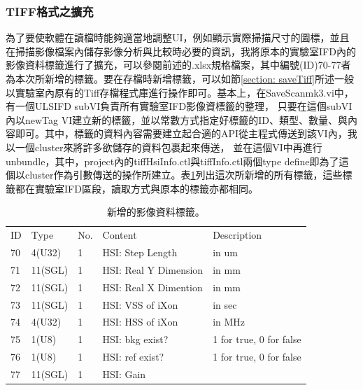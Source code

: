 \documentclass[12pt]{article}
\begin{document}
    \subsubsection{TIFF格式之擴充}
    為了要使軟體在讀檔時能夠適當地調整UI，例如顯示實際掃描尺寸的圖標，並且在掃描影像檔案內儲存影像分析與比較時必要的資訊，我將原本的實驗室IFD內的影像資料標籤進行了擴充，可以參閱前述的.xlsx規格檔案，其中編號(ID)70-77者
    為本次所新增的標籤。要在存檔時新增標籤，可以如節\ref{section: saveTiff}所述一般以實驗室內原有的Tiff存檔程式庫進行操作即可。基本上，在SaveScan\textunderscore mk3.vi中，有一個ULSIFD subVI負責所有實驗室IFD影像資標籤的整理，
    只要在這個subVI內以newTag VI建立新的標籤，並以常數方式指定好標籤的ID、類型、數量、與內容即可。其中，標籤的資料內容需要建立起合適的API從主程式傳送到該VI內，我以一個cluster來將許多欲儲存的資料包裹起來傳送，
    並在這個VI中再進行unbundle，其中，project內的tiffHsiInfo.ctl與tiffInfo.ctl兩個type define即為了這個以cluster作為引數傳送的操作所建立。表\ref{tab: new tag}列出這次所新增的所有標籤，這些標籤都在實驗室IFD區段，讀取方式與原本的標籤亦都相同。
    \begin{table}[ht]
        \begin{tabular}{lllll}
        ID & Type    & No. & Content & Description \\
        70 & 4(U32)  & 1 & HSI: Step Length      & in um                   \\
        71 & 11(SGL) & 1 & HSI: Real Y Dimension & in mm                   \\
        72 & 11(SGL) & 1 & HSI: Real X Dimention & in mm                   \\
        73 & 11(SGL) & 1 & HSI: VSS of iXon      & in sec                  \\
        74 & 4(U32)  & 1 & HSI: HSS of iXon      & in MHz                  \\
        75 & 1(U8)   & 1 & HSI: bkg exist?       & 1 for true, 0 for false \\
        76 & 1(U8)   & 1 & HSI: ref exist?       & 1 for true, 0 for false \\
        77 & 11(SGL) & 1 & HSI: Gain             &                        
        \end{tabular}
        \caption{新增的影像資料標籤。}
        \label{tab: new tag}
        \end{table}
\end{document}
